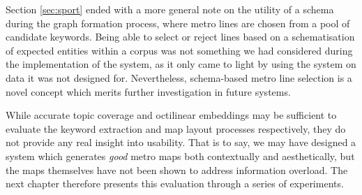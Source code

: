 Section \ref{sec:sport} ended with a more general note on the utility of a schema during the graph formation process, where metro lines are chosen from a pool of candidate keywords. Being able to select or reject lines based on a schematisation of expected entities within a corpus was not something we had considered during the implementation of the system, as it only came to light by using the system on data it was not designed for. Nevertheless, schema-based metro line selection is a novel concept which merits further investigation in future systems.

While accurate topic coverage and octilinear embeddings may be sufficient to evaluate the keyword extraction and map layout processes respectively, they do not provide any real insight into usability. That is to say, we may have designed a system which generates \textit{good} metro maps both contextually and aesthetically, but the maps themselves have not been shown to address information overload. The next chapter therefore presents this evaluation through a series of experiments.

